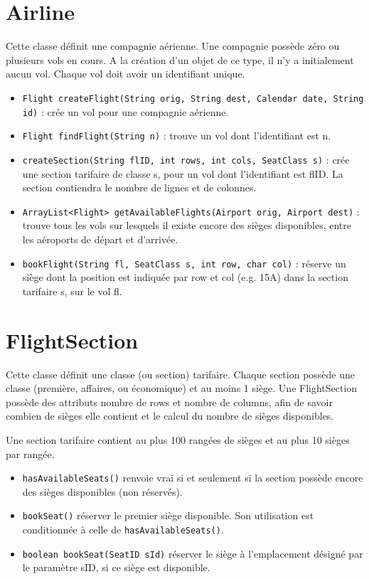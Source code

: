 \documentclass[a4paper,12pt,francais,twoside]{article}
\begin{document}
\section{Airline}
Cette classe définit une compagnie aérienne. Une compagnie possède zéro ou plusieurs
vols en cours. A la création d'un objet de ce type, il n'y a initialement aucun vol.
Chaque vol doit avoir un identifiant unique.

\begin{itemize}
	\item \texttt{Flight createFlight(String orig, String dest, Calendar date, String id)} : crée
	un vol pour une compagnie aérienne.
	\item \texttt{Flight findFlight(String n)} : trouve un vol dont l'identifiant est n.
	\item \texttt{createSection(String flID, int rows, int cols, SeatClass s)} : crée une section
	tarifaire de classe s, pour un vol dont l'identifiant est flID. La section contiendra le
	nombre de lignes et de colonnes.
	\item \texttt{ArrayList<Flight> getAvailableFlights(Airport orig, Airport dest)} : trouve tous les
	vols sur lesquels il existe encore des sièges disponibles, entre les aéroports de départ
	et d'arrivée.
	\item \texttt{bookFlight(String fl, SeatClass s, int row, char col)} : réserve un siège dont
	la position est indiquée par row et col (e.g. 15A) dans la section tarifaire s, sur le vol fl.
\end{itemize}

\section{FlightSection}
Cette classe définit une classe (ou section) tarifaire. Chaque section possède une classe
(première, affaires, ou économique) et au moins 1 siège.  Une FlightSection possède 
des attributs nombre de rows et nombre de columns, afin de savoir combien de sièges elle contient
et le calcul du nombre de sièges disponibles.

Une section tarifaire contient au plus 100 rangées de sièges et au plus 10 sièges par rangée.

\begin{itemize}
	\item \texttt{hasAvailableSeats()}
	renvoie vrai si et seulement si la section possède encore des sièges disponibles (non réservés).
	\item \texttt{bookSeat()} réserver le premier siège disponible. Son utilisation est conditionnée
	à celle de \texttt{hasAvailableSeats()}.
	\item \texttt{boolean bookSeat(SeatID sId)} réserver le siège à l'emplacement désigné par le
	paramètre sID, si ce siège est disponible.
\end{itemize}
\end{document}
